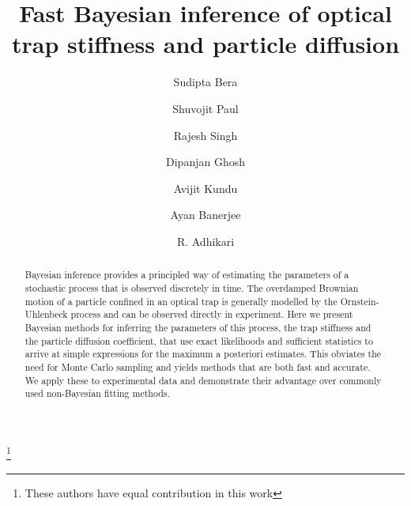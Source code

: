 \documentclass[english,aps, twocolumn, pre,superscriptaddress]{revtex4-1}
\begin{document}
\title{Fast Bayesian inference of optical trap stiffness and particle diffusion}

\author{Sudipta Bera\dag{}}


\author{Shuvojit Paul\dag{}}


\author{Rajesh Singh}


\author{Dipanjan Ghosh}


\author{Avijit Kundu}


\author{Ayan Banerjee}



\author{R. Adhikari}



\thanks{\dag These authors have equal contribution in this work}
\begin{abstract}
Bayesian inference provides a principled way of estimating the parameters
of a stochastic process that is observed discretely in time. The overdamped
Brownian motion of a particle confined in an optical trap is generally
modelled by the Ornstein-Uhlenbeck process and can be observed directly
in experiment. Here we present Bayesian methods for inferring the
parameters of this process, the trap stiffness and the particle diffusion
coefficient, that use exact likelihoods and sufficient statistics
to arrive at simple expressions for the maximum a posteriori estimates.
This obviates the need for Monte Carlo sampling and yields methods
that are both fast and accurate. We apply these to experimental data
and demonstrate their advantage over commonly used non-Bayesian fitting
methods. 
\end{abstract}
\maketitle
\end{document}
